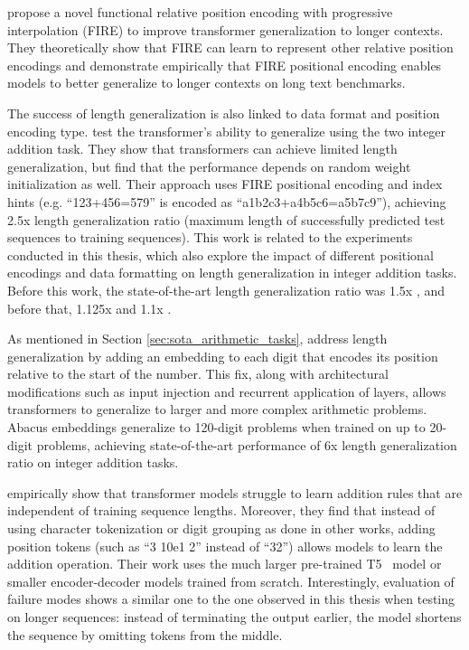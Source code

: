 \cite{li_functional_2024} propose a novel functional relative position encoding with progressive interpolation (FIRE) to improve transformer generalization to longer contexts. They theoretically show that FIRE can learn to represent other relative position encodings and demonstrate empirically that FIRE positional encoding enables models to better generalize to longer contexts on long text benchmarks.

The success of length generalization is also linked to data format and position encoding type. \cite{zhou_transformers_2024} test the transformer's ability to generalize using the two integer addition task. They show that transformers can achieve limited length generalization, but find that the performance depends on random weight initialization as well. Their approach uses FIRE positional encoding and index hints (e.g. ``123+456=579'' is encoded as ``a1b2c3+a4b5c6=a5b7c9''), achieving 2.5x length generalization ratio (maximum length of successfully predicted test sequences to training sequences). This work is related to the experiments conducted in this thesis, which also explore the impact of different positional encodings and data formatting on length generalization in integer addition tasks. Before this work, the state-of-the-art length generalization ratio was 1.5x \parencite{zhou_what_2023}, and before that, 1.125x \parencite{kazemnejad_impact_2023} and 1.1x \parencite{shen_positional_2023}.

As mentioned in Section \ref{sec:sota_arithmetic_tasks}, \cite{mcleish_transformers_2024} address length generalization by adding an embedding to each digit that encodes its position relative to the start of the number. This fix, along with architectural modifications such as input injection and recurrent application of layers, allows transformers to generalize to larger and more complex arithmetic problems. Abacus embeddings generalize to 120-digit problems when trained on up to 20-digit problems, achieving state-of-the-art performance of 6x length generalization ratio on integer addition tasks.

\cite{nogueira_investigating_2021} empirically show that transformer models struggle to learn addition rules that are independent of training sequence lengths. Moreover, they find that instead of using character tokenization or digit grouping as done in other works, adding position tokens (such as ``3 10e1 2'' instead of ``32'') allows models to learn the addition operation. Their work uses the much larger pre-trained T5~\parencite{raffel_exploring_2020} model or smaller encoder-decoder models trained from scratch. Interestingly, evaluation of failure modes shows a similar one to the one observed in this thesis when testing on longer sequences: instead of terminating the output earlier, the model shortens the sequence by omitting tokens from the middle.

